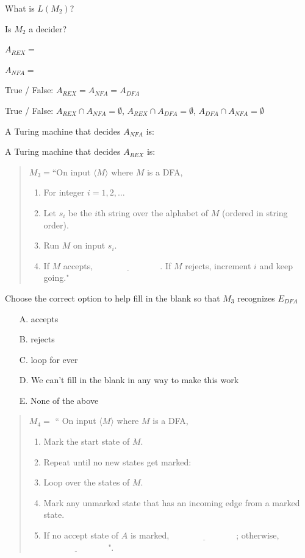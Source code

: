\documentclass[12pt, oneside]{article}
\begin{document}
  What is $L(M_2)$? 

  \vfill
  
  Is $M_2$ a decider?
  
  \vfill
  
    
\newpage
  $A_{REX} = $

  $A_{NFA} = $


  True / False: $A_{REX} = A_{NFA} = A_{DFA}$

  True / False: $A_{REX} \cap A_{NFA} = \emptyset$, $A_{REX} \cap A_{DFA} = \emptyset$, $A_{DFA} \cap A_{NFA} = \emptyset$

  
  A Turing machine that  decides $A_{NFA}$ is: 
  
  \vfill
  
  A Turing machine that  decides $A_{REX}$ is: 
  
  \vfill
  \newpage
  
  \begin{quote}
  $M_3 =  $``On  input  $\langle M\rangle$ where $M$ is a  DFA,
  \begin{enumerate}
  \item For integer  $i = 1, 2, \ldots$
  \item \qquad Let  $s_i$ be the  $i$th string over  the alphabet of  $M$ (ordered in  string order).
  \item \qquad Run $M$ on  input  $s_i$.
  \item \qquad If $M$  accepts,  $\underline{\phantom{FILL  IN BLANK}}$.  If $M$  rejects, increment $i$ and keep going."
  \end{enumerate}
  \end{quote}
  

Choose the correct option to help fill in the blank so that $M_3$ recognizes $E_{DFA}$
\begin{itemize}
\item[A.] accepts
\item[B.] rejects
\item[C.] loop for ever
\item[D.] We can't fill in the blank in any way to make this work
\item[E.] None of the above
\end{itemize}

  
  \begin{quote}
  $M_4 =  $ `` On  input $\langle M \rangle$ where $M$ is  a  DFA,
  \begin{enumerate}
  \item Mark the start  state  of $M$.
  \item Repeat until no  new states get marked:
  \item \qquad Loop over the states of $M$. 
  \item \qquad Mark any unmarked  state  that  has an incoming  edge  from a marked state.
  \item If  no  accept state of $A$ is  marked, $\underline{\phantom{FILL  IN BLANK}}$;  otherwise, 
  $\underline{\phantom{FILL  IN BLANK}}$".
  \end{enumerate}
  \end{quote}
  
\end{document}
